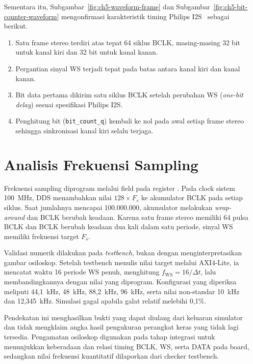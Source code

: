 Sementara itu, Subgambar~\ref{fig:ch5-waveform-frame} dan Subgambar~\ref{fig:ch5-bit-counter-waveform} mengonfirmasi karakteristik timing Philips I2S~\citep{philips_i2s_1986} sebagai berikut.

\begin{enumerate}
	\item Satu frame stereo terdiri atas tepat 64 siklus BCLK, masing-masing 32 bit untuk kanal kiri dan 32 bit untuk kanal kanan.
	\item Pergantian sinyal WS terjadi tepat pada batas antara kanal kiri dan kanal kanan.
	\item Bit data pertama dikirim satu siklus BCLK setelah perubahan WS (\textit{one-bit delay}) sesuai spesifikasi Philips I2S.
	\item Penghitung bit (\texttt{bit\_count\_q}) kembali ke nol pada awal setiap frame stereo sehingga sinkronisasi kanal kiri selalu terjaga.
\end{enumerate}
\section{Analisis Frekuensi Sampling}

Frekuensi sampling diprogram melalui field  pada register . Pada clock sistem 100~MHz, DDS menambahkan nilai $128 \times F_s$ ke akumulator BCLK pada setiap siklus. Saat jumlahnya mencapai 100.000.000, akumulator melakukan \textit{wrap-around} dan BCLK berubah keadaan. Karena satu frame stereo memiliki 64 pulsa BCLK dan BCLK berubah keadaan dua kali dalam satu periode, sinyal WS memiliki frekuensi target $F_s$.

Validasi numerik dilakukan pada \textit{testbench}, bukan dengan menginterpretasikan gambar osiloskop. Setelah testbench menulis nilai target melalui AXI4-Lite, ia mencatat waktu 16 periode WS penuh, menghitung $f_\mathrm{WS}=16/\Delta t$, lalu membandingkannya dengan nilai yang diprogram. Konfigurasi yang diperiksa meliputi 44,1~kHz, 48~kHz, 88,2~kHz, 96~kHz, serta nilai non-standar 10~kHz dan 12,345~kHz. Simulasi gagal apabila galat relatif melebihi 0,1\%.

Pendekatan ini menghasilkan bukti yang dapat diulang dari keluaran simulator dan tidak mengklaim angka hasil pengukuran perangkat keras yang tidak lagi tersedia. Pengamatan osiloskop digunakan pada tahap integrasi untuk menunjukkan keberadaan dan relasi timing BCLK, WS, serta DATA pada board, sedangkan nilai frekuensi kuantitatif dilaporkan dari checker testbench.

